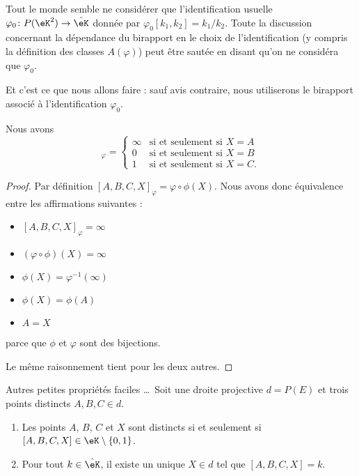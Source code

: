 \begin{remark}
	Tout le monde semble ne considérer que l'identification usuelle \( \varphi_0\colon P(\eK^2)\to \hat\eK\) donnée par \( \varphi_0[k_1,k_2]=k_1/k_2\). Toute la discussion concernant la dépendance du birapport en le choix de l'identification (y compris la définition des classes \( A(\varphi)\)) peut être sautée en disant qu'on ne considéra que \( \varphi_0\).

	Et c'est ce que nous allons faire : sauf avis contraire, nous utiliserons le birapport associé à l'identification \( \varphi_0\).
\end{remark}

\begin{lemma}        \label{LEMooCOFTooVGKdVO}
	Nous avons
	\begin{equation}
		[A,B,C,X]_{\varphi}=\begin{cases}
			\infty & \text{si et seulement si } X=A \\
			0      & \text{si et seulement si }X=B  \\
			1      & \text{si et seulement si }X=C.
		\end{cases}
	\end{equation}
\end{lemma}

\begin{proof}
	Par définition \( [A,B,C,X]_{\varphi}=\varphi\circ\phi(X)\). Nous avons donc équivalence entre les affirmations suivantes :
	\begin{itemize}
		\item \( [A,B,C,X]_{\varphi}=\infty\)
		\item \( (\varphi\circ\phi)(X)=\infty\)
		\item \( \phi(X)=\varphi^{-1}(\infty)\)
		\item \( \phi(X)=\phi(A)\)
		\item \( A=X\)
	\end{itemize}
	parce que \( \phi\) et \( \varphi\) sont des bijections.

	Le même raisonnement tient pour les deux autres.
\end{proof}

\begin{proposition}     \label{PROPooKQZRooVCXPLW}
	Autres petites propriétés faciles \ldots\ Soit une droite projective \( d=P(E)\) et trois points distincts \( A,B,C\in d\).
	\begin{enumerate}
		\item       \label{ITEMooOIPZooQFFYIn}
		      Les points \( A\), \( B\), \( C\) et \( X\) sont distincts si et seulement si \( [A,B,C,X]\in \eK\setminus\{ 0,1 \}\).
		\item       \label{ITEMooBEBEooVfiJXY}
		      Pour tout \( k\in \hat\eK\), il existe un unique \( X\in d\) tel que \( [A,B,C,X]=k\).
	\end{enumerate}
\end{proposition}

